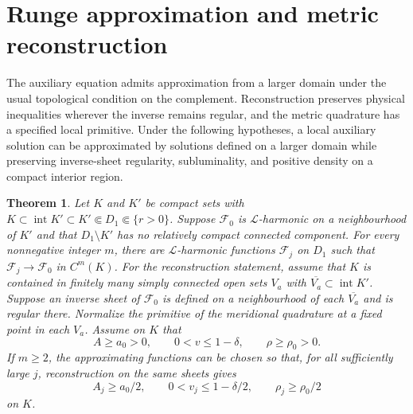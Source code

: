 \documentclass[11pt,a4paper]{article}
\numberwithin{equation}{section}
\theoremstyle{plain}
\newtheorem{theorem}{Theorem}
\theoremstyle{definition}
\theoremstyle{remark}
\begin{document}
\tableofcontents

\section{Runge approximation and metric reconstruction}\label{supp:auxiliary-analysis}

The auxiliary equation admits approximation from a larger domain under the usual topological condition on the complement. Reconstruction preserves physical inequalities wherever the inverse remains regular, and the metric quadrature has a specified local primitive. Under the following hypotheses, a local auxiliary solution can be approximated by solutions defined on a larger domain while preserving inverse-sheet regularity, subluminality, and positive density on a compact interior region.
\begin{theorem}\label{thm:runge-realization}
Let $K$ and $K'$ be compact sets with $K\subset\operatorname{int}K'\subset K'\Subset D_1\Subset\{r>0\}$. Suppose $\mathcal F_0$ is $\mathcal L$-harmonic on a neighbourhood of
$K'$ and that $D_1\setminus K'$ has no relatively compact connected
component. For every nonnegative integer $m$, there are $\mathcal L$-harmonic functions $\mathcal F_j$ on $D_1$ such that $\mathcal F_j\to\mathcal F_0$ in $C^m(K)$. For the reconstruction statement, assume that $K$ is contained in
finitely many simply connected open sets $V_a$ with
$\overline{V_a}\subset\operatorname{int}K'$. Suppose an inverse
sheet of $\mathcal F_0$ is defined on a neighbourhood of each
$\overline{V_a}$ and is regular there. Normalize the primitive of
the meridional quadrature at a fixed point in each $V_a$. Assume on $K$ that
\begin{equation}\label{eq:runge-core-margins}
A\geqslant a_0>0,\qquad
0<v\leqslant1-\delta,\qquad
\rho\geqslant\rho_0>0.
\end{equation}
If $m\geqslant 2$, the approximating functions can be chosen so that,
for all sufficiently large $j$, reconstruction on the same sheets gives
\begin{equation}
A_j\geqslant a_0/2,\qquad
0<v_j\leqslant1-\delta/2,\qquad
\rho_j\geqslant\rho_0/2
\end{equation}
on $K$.
\end{theorem}
\end{document}
